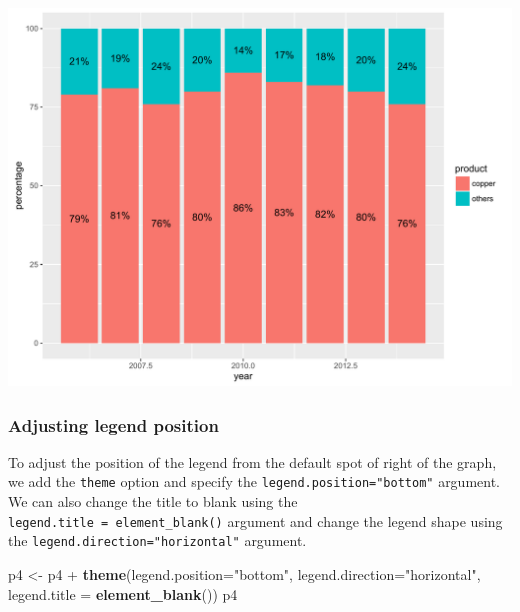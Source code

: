 \documentclass[]{article}
\newenvironment{Shaded}{\begin{snugshade}}{\end{snugshade}}
\newcommand{\KeywordTok}[1]{\textcolor[rgb]{0.13,0.29,0.53}{\textbf{{#1}}}}
\newcommand{\DataTypeTok}[1]{\textcolor[rgb]{0.13,0.29,0.53}{{#1}}}
\newcommand{\StringTok}[1]{\textcolor[rgb]{0.31,0.60,0.02}{{#1}}}
\newcommand{\NormalTok}[1]{{#1}}
\begin{document}
\begin{center}\includegraphics{0_all_posts_pdf/stacked_3-1} \end{center}

\subsubsection{Adjusting legend
position}\label{adjusting-legend-position-2}

To adjust the position of the legend from the default spot of right of
the graph, we add the \texttt{theme} option and specify the
\texttt{legend.position="bottom"} argument. We can also change the title
to blank using the \texttt{legend.title\ =\ element\_blank()} argument
and change the legend shape using the
\texttt{legend.direction="horizontal"} argument.

\begin{Shaded}
\begin{Highlighting}[]
\NormalTok{p4 <-}\StringTok{ }\NormalTok{p4 +}\StringTok{ }\KeywordTok{theme}\NormalTok{(}\DataTypeTok{legend.position=}\StringTok{"bottom"}\NormalTok{, }\DataTypeTok{legend.direction=}\StringTok{"horizontal"}\NormalTok{, }
                 \DataTypeTok{legend.title =} \KeywordTok{element_blank}\NormalTok{())}
\NormalTok{p4}
\end{Highlighting}
\end{Shaded}
\end{document}
